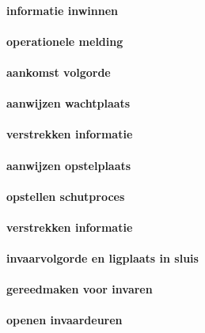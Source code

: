 \documentclass[11pt]{report} %
\begin{document}
\paragraph{informatie inwinnen}


\paragraph{operationele melding}


\paragraph{aankomst volgorde}

\paragraph{aanwijzen wachtplaats}


\paragraph{verstrekken informatie}


\paragraph{aanwijzen opstelplaats}

\paragraph{opstellen schutproces}


\paragraph{verstrekken informatie}


\paragraph{invaarvolgorde en ligplaats in sluis}

\paragraph{gereedmaken voor invaren}



\paragraph{openen invaardeuren}
\end{document}
